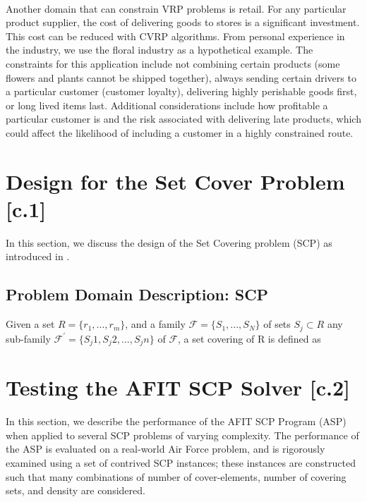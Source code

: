 \documentclass[12pt]{article}
\begin{document}
\paragraph{}
Another domain that can constrain VRP problems is retail. For any particular product supplier, the cost of delivering goods to stores is a significant investment. This cost can be reduced with CVRP algorithms. From personal experience in the industry, we use the floral industry as a hypothetical example. The constraints for this application include not combining certain products (some flowers and plants cannot be shipped together), always sending certain drivers to a particular customer (customer loyalty), delivering highly perishable goods first, or long lived items last. Additional considerations include how profitable a particular customer is and the risk associated with delivering late products, which could affect the likelihood of including a customer in a highly constrained route.

\section{Design for the Set Cover Problem [c.1]} \label{scn:design}

In this section, we discuss the design of the Set Covering problem (SCP) as introduced in \cite{ClassNotes686}.

\subsection{Problem Domain Description: SCP}
Given a set $R=\{r_1,...,r_m\}$, and a family $\mathcal{F}=\{S_1,...,S_N\}$ of sets $S_j \subset R$ any sub-family $\mathcal{F^\prime}=\{S_j1, S_j2,...,S_jn\}$ of $\mathcal{F}$, a set covering of R is defined as


\section{Testing the AFIT SCP Solver [c.2]} \label{scn:testing}

In this section, we describe the performance of the AFIT SCP Program (ASP) when applied to several SCP problems of varying complexity. The performance of the ASP is evaluated on a real-world Air Force problem, and is rigorously examined using a set of contrived SCP instances; these instances are constructed such that many combinations of number of cover-elements, number of covering sets, and density are considered. 
\end{document}
